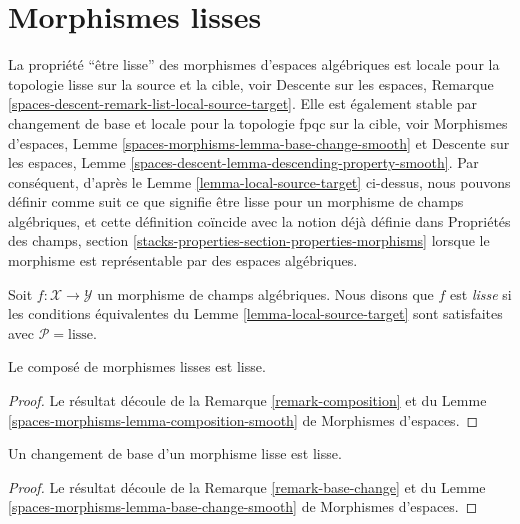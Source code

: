 \section{Morphismes lisses}
\label{section-smooth}

\noindent
La propriété ``être lisse'' des morphismes d'espaces
algébriques est locale pour la topologie lisse sur la source et la cible, voir
Descente sur les espaces, Remarque \ref{spaces-descent-remark-list-local-source-target}.
Elle est également stable par changement de base et locale pour la topologie fpqc sur la cible, voir
Morphismes d'espaces,
Lemme \ref{spaces-morphisms-lemma-base-change-smooth}
et
Descente sur les espaces, Lemme
\ref{spaces-descent-lemma-descending-property-smooth}.
Par conséquent, d'après le
Lemme \ref{lemma-local-source-target}
ci-dessus, nous pouvons définir comme suit ce que signifie être lisse pour un
morphisme de champs algébriques, et cette définition coïncide avec la notion
déjà définie dans
Propriétés des champs,
section \ref{stacks-properties-section-properties-morphisms}
lorsque le morphisme est représentable par des espaces algébriques.

\begin{definition}
\label{definition-smooth}
Soit $f : \mathcal{X} \to \mathcal{Y}$ un morphisme de champs algébriques.
Nous disons que $f$ est {\it lisse} si les conditions équivalentes du
Lemme \ref{lemma-local-source-target}
sont satisfaites avec $\mathcal{P} = \text{lisse}$.
\end{definition}

\begin{lemma}
\label{lemma-composition-smooth}
Le composé de morphismes lisses est lisse.
\end{lemma}

\begin{proof}
Le résultat découle de
la Remarque \ref{remark-composition}
et du
Lemme \ref{spaces-morphisms-lemma-composition-smooth}
de Morphismes d'espaces.
\end{proof}

\begin{lemma}
\label{lemma-base-change-smooth}
Un changement de base d'un morphisme lisse est lisse.
\end{lemma}

\begin{proof}
Le résultat découle de
la Remarque \ref{remark-base-change}
et du
Lemme \ref{spaces-morphisms-lemma-base-change-smooth}
de Morphismes d'espaces.
\end{proof}

